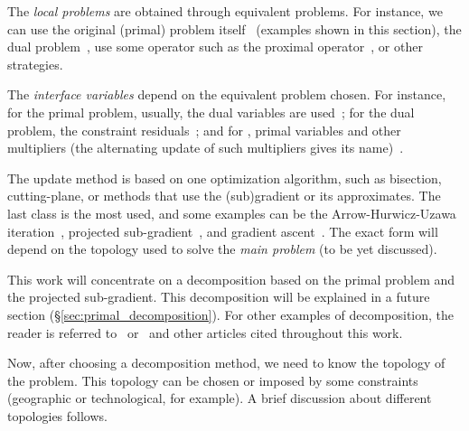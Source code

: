 \documentclass[../main.tex]{subfiles}
\begin{document}
The \emph{local problems} are obtained through equivalent problems.
For instance, we can use the original (primal) problem itself~\cite{PaulenEtAl2016, CamisaEtAl2022} (examples shown in this section), the dual problem~\cite{MorosanEtAl2011, BourdaisEtAl2012,VelardeEtAl2018},  use some operator such as the proximal operator~\cite{Iiduka2019,OconnorVandenberghe2014}, or other strategies.

The \emph{interface variables} depend on the equivalent problem chosen. For instance, for the primal problem, usually, the dual variables are used~\cite{Cohen1978}; for the dual problem, the constraint residuals~\cite{BoydEtAl2015}; and for \ADMM, primal variables and other multipliers (the alternating update of such multipliers gives its name)~\cite{BoydEtAl2011}.

The update method is based on one optimization algorithm, such as bisection, cutting-plane, or methods that use the (sub)gradient or its approximates. The last class is the most used, and some examples can be the Arrow-Hurwicz-Uzawa iteration~\cite{BourdaisEtAl2012}, projected sub-gradient~\cite{BiegelEtAl2012}, and gradient ascent~\cite{BoydEtAl2011}.
The exact form will depend on the topology used to solve the \emph{main problem} (to be yet discussed).

This work will concentrate on a decomposition based on the primal problem and the projected sub-gradient.
This decomposition will be explained in a future section (\S\ref{sec:primal_decomposition}).
For other examples of decomposition, the reader is referred to~\cite{MaestreEtAl2014} or~\cite{ConejoEtAl2006} and other articles cited throughout this work.

Now, after choosing a decomposition method, we need to know the topology of the problem.
This topology can be chosen or imposed by some constraints (geographic or technological, for example). A brief discussion about different topologies follows.

\end{document}
